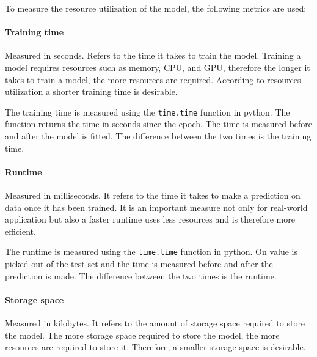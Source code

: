 To measure the resource utilization of the model, the following metrics are used:

\paragraph*{Training time}
Measured in seconds. Refers to the time it takes to train the model.
Training a model requires resources such as memory, CPU, and GPU, therefore the longer it takes to train a model, the more resources are required. According to resources utilization a shorter training time is desirable.

The training time is measured using the \texttt{time.time} function in python. The function returns the time in seconds since the epoch. The time is measured before and after the model is fitted. The difference between the two times is the training time.

\paragraph*{Runtime}
Measured in milliseconds. It refers to the time it takes to make a prediction on data once it has been trained.
It is an important measure not only for real-world application but also a faster runtime uses less resources and is therefore more efficient.

The runtime is measured using the \texttt{time.time}  function in python.  On value is picked out of the test set and the time is measured before and after the prediction is made. The difference between the two times is the runtime.

\paragraph*{Storage space}
Measured in kilobytes. It refers to the amount of storage space required to store the model.
The more storage space required to store the model, the more resources are required to store it. Therefore, a smaller storage space is desirable.

